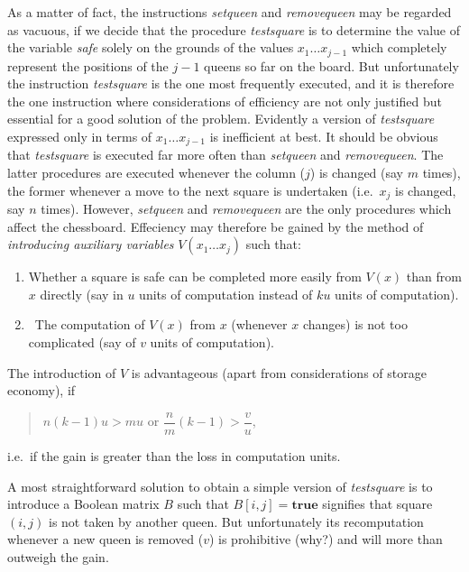 As a matter of fact, the instructions \emph{setqueen} and \emph{removequeen}
may be regarded as vacuous, if we decide that the procedure \emph{testsquare}
is to determine the value of the variable \emph{safe} solely on the grounds of
the values $x_1 \ldots x_{j-1}$ which completely represent the positions of the
$j - 1$ queens so far on the board.  But unfortunately the instruction
\emph{testsquare} is the one most frequently executed, and it is therefore the
one instruction where considerations of efficiency are not only justified but
essential for a good solution of the problem.  Evidently a version of
\emph{testsquare} expressed only in terms of $x_1 \ldots x_{j-1}$ is
inefficient at best.  It should be obvious that \emph{testsquare} is executed
far more often than \emph{setqueen} and \emph{removequeen}.  The latter
procedures are executed whenever the column ($j$) is changed (say $m$ times),
the former whenever a move to the next square is undertaken (i.e.\ $x_j$ is
changed, say $n$ times).  However, \emph{setqueen} and \emph{removequeen} are
the only procedures which affect the chessboard.  Effeciency may therefore be
gained by the method of \emph{introducing auxiliary variables} $V(x_1 \ldots
x_j)$ such that:

\begin{enumerate}
    \item Whether a square is safe can be completed more easily from $V(x)$
          than from $x$ directly (say in $u$ units of computation instead of
          $ku$ units of computation).

    \item The computation of $V(x)$ from $x$ (whenever $x$ changes) is not too
          complicated (say of $v$ units of computation).
\end{enumerate}

The introduction of $V$ is advantageous (apart from considerations of storage
economy), if

\begin{quote}
$n(k - 1)u > mu$ \qquad or \qquad $\dfrac{n}{m}(k - 1) > \dfrac{v}{u}$,
\end{quote}

i.e.\ if the gain is greater than the loss in computation units.

A most straightforward solution to obtain a simple version of \emph{testsquare}
is to introduce a Boolean matrix $B$ such that $B[i,j] = \textbf{true}$
signifies that square $(i, j)$ is not taken by another queen.  But
unfortunately its recomputation whenever a new queen is removed ($v$) is
prohibitive (why?) and will more than outweigh the gain.

